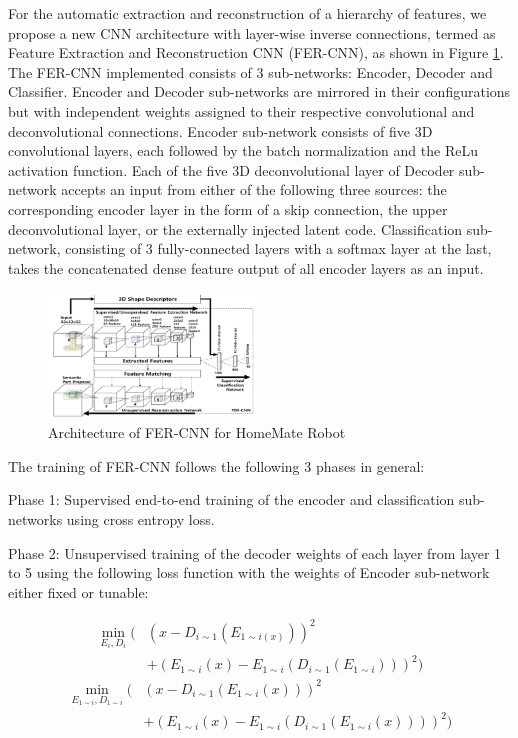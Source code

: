 \documentclass{ieeeaccess}
\begin{document}
For the automatic extraction and reconstruction of a
hierarchy of features, we propose a new CNN architecture
with layer-wise inverse connections, termed as Feature
Extraction and Reconstruction CNN (FER-CNN), as shown in
Figure \ref{deep_architecture}. The FER-CNN implemented consists of 3
sub-networks: Encoder, Decoder and Classifier. Encoder and
Decoder sub-networks are mirrored in their configurations but
with independent weights assigned to their respective
convolutional and deconvolutional connections. Encoder
sub-network consists of five 3D convolutional layers, each
followed by the batch normalization and the ReLu activation
function. Each of the five 3D deconvolutional layer of
Decoder sub-network accepts an input from either of the
following three sources: the corresponding encoder layer in
the form of a skip connection, the upper deconvolutional layer,
or the externally injected latent code. Classification
sub-network, consisting of 3 fully-connected layers with a
softmax layer at the last, takes the concatenated dense feature
output of all encoder layers as an input.

\begin{figure}[t!]
\centering
\label{deep_architecture}
\includegraphics[width=0.5\textwidth]{deep_architecture.png}
\caption{Architecture of FER-CNN for HomeMate Robot}
\end{figure}

The training of FER-CNN follows the following 3 phases
in general:

Phase 1: Supervised end-to-end training of the
encoder and classification sub-networks using cross
entropy loss.

Phase 2: Unsupervised training of the decoder weights
of each layer from layer 1 to 5 using the following loss
function with the weights of Encoder sub-network
either fixed or tunable:

\begin{equation}
\begin{split}
\min_{E_i,D_i}( & (x-D_{i\sim 1}(E_{1\sim i(x)}))^2 \\ & + (E_{1\sim i}(x) - E_{1\sim i}(D_{i\sim 1}(E_{1\sim i})))^2)
\end{split}
\end{equation}
\begin{equation}
\begin{split}
\min_{E_{1\sim i},D_{1\sim i}}( & (x-D_{i\sim 1}(E_{1\sim i}(x)))^2 \\ & + (E_{1\sim i}(x) - E_{1\sim i}(D_{i\sim 1}(E_{1\sim i}(x))))^2)
\end{split}
\end{equation}
\end{document}
